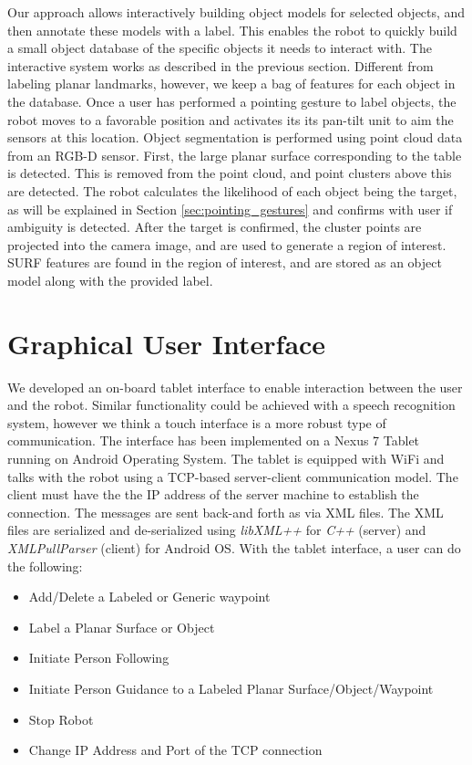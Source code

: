 Our approach allows interactively building object models for selected objects, and then annotate these models with a label. This enables the robot to quickly build a small object database of the specific objects it needs to interact with. The interactive system works as described in the previous section. Different from labeling planar landmarks, however, we keep a bag of features for each object in the database. Once a user has performed a pointing gesture to label objects, the robot moves to a favorable position and activates its its pan-tilt unit to aim the sensors at this location. Object segmentation is performed using point cloud data from an RGB-D sensor. First, the large planar surface corresponding to the table is detected. This is removed from the point cloud, and point clusters above this are detected. The robot calculates the likelihood of each object being the target, as will be explained in Section \ref{sec:pointing_gestures} and confirms with user if ambiguity is detected. After the target is confirmed, the cluster points are projected into the camera image, and are used to generate a region of interest. SURF features are found in the region of interest, and are stored as an object model along with the provided label.

\section{Graphical User Interface}
\label{sec:map_ui}

We developed an on-board tablet interface to enable interaction between the user and the robot. Similar functionality could be achieved with a speech recognition system, however we think a touch interface is a more robust type of communication. The interface has been implemented on a Nexus 7 Tablet running on Android Operating System. The tablet is equipped with WiFi and talks with the robot using a TCP-based server-client communication model. The client must have the the IP address of the server machine to establish the connection. The messages are sent back-and forth as via XML files. The XML files are serialized and de-serialized using \textit{libXML++} for \textit{C++} (server) and \textit{XMLPullParser} (client) for Android OS. With the tablet interface, a user can do the following:

\begin{itemize}
\item Add/Delete a Labeled or Generic waypoint
\item Label a Planar Surface or Object
\item Initiate Person Following
\item Initiate Person Guidance to a Labeled Planar Surface/Object/Waypoint
\item Stop Robot
\item Change IP Address and Port of the TCP connection
\end{itemize}

